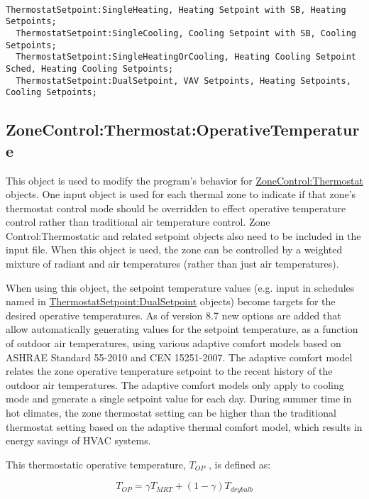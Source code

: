 \begin{lstlisting}

ThermostatSetpoint:SingleHeating, Heating Setpoint with SB, Heating Setpoints;
  ThermostatSetpoint:SingleCooling, Cooling Setpoint with SB, Cooling Setpoints;
  ThermostatSetpoint:SingleHeatingOrCooling, Heating Cooling Setpoint Sched, Heating Cooling Setpoints;
  ThermostatSetpoint:DualSetpoint, VAV Setpoints, Heating Setpoints, Cooling Setpoints;
\end{lstlisting}

\subsection{ZoneControl:Thermostat:OperativeTemperature}\label{zonecontrolthermostatoperativetemperature}

This object is used to modify the program's behavior for \hyperref[zonecontrolthermostat]{ZoneControl:Thermostat} objects. One input object is used for each thermal zone to indicate if that zone's thermostat control mode should be overridden to effect operative temperature control rather than traditional air temperature control. Zone Control:Thermostatic and related setpoint objects also need to be included in the input file. When this object is used, the zone can be controlled by a weighted mixture of radiant and air temperatures (rather than just air temperatures).

When using this object, the setpoint temperature values (e.g. input in schedules named in \hyperref[thermostatsetpointdualsetpoint]{ThermostatSetpoint:DualSetpoint} objects) become targets for the desired operative temperatures. As of version 8.7 new options are added that allow automatically generating values for the setpoint temperature, as a function of outdoor air temperatures, using various adaptive comfort models based on ASHRAE Standard 55-2010 and CEN 15251-2007. The adaptive comfort model relates the zone operative temperature setpoint to the recent history of the outdoor air temperatures.  The adaptive comfort models only apply to cooling mode and generate a single setpoint value for each day. During summer time in hot climates, the zone thermostat setting can be higher than the traditional thermostat setting based on the adaptive thermal comfort model, which results in energy savings of HVAC systems.

This thermostatic operative temperature, \({T_{OP}}\) , is defined as:

\begin{equation}
{T_{OP}} = \gamma {T_{MRT}} + (1 - \gamma ){T_{drybulb}}
\end{equation}

